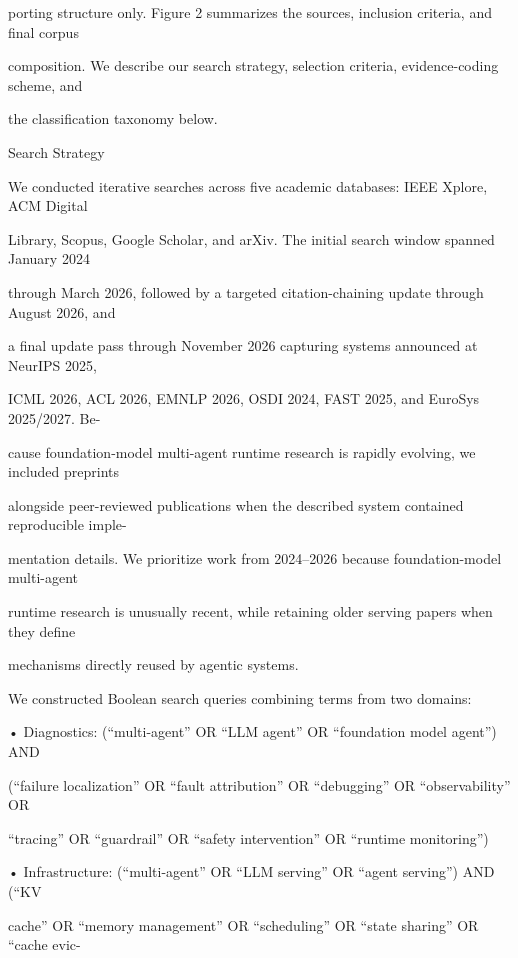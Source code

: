 \begin{flushleft}
\noindent porting structure only. Figure 2 summarizes the sources, inclusion criteria, and final corpus\par
\noindent composition. We describe our search strategy, selection criteria, evidence-coding scheme, and\par
\noindent the classification taxonomy below.\par
\par\smallskip
{} Search Strategy\par
\noindent We conducted iterative searches across five academic databases: IEEE Xplore, ACM Digital\par
\noindent Library, Scopus, Google Scholar, and arXiv. The initial search window spanned January 2024\par
\noindent through March 2026, followed by a targeted citation-chaining update through August 2026, and\par
\noindent a final update pass through November 2026 capturing systems announced at NeurIPS 2025,\par
\noindent ICML 2026, ACL 2026, EMNLP 2026, OSDI 2024, FAST 2025, and EuroSys 2025/2027. Be-\par
\noindent cause foundation-model multi-agent runtime research is rapidly evolving, we included preprints\par
\noindent alongside peer-reviewed publications when the described system contained reproducible imple-\par
\noindent mentation details. We prioritize work from 2024–2026 because foundation-model multi-agent\par
\noindent runtime research is unusually recent, while retaining older serving papers when they define\par
\noindent mechanisms directly reused by agentic systems.\par
\noindent  We constructed Boolean search queries combining terms from two domains:\par
\noindent  • Diagnostics: (“multi-agent” OR “LLM agent” OR “foundation model agent”) AND\par
\noindent  (“failure localization” OR “fault attribution” OR “debugging” OR “observability” OR\par
\noindent  “tracing” OR “guardrail” OR “safety intervention” OR “runtime monitoring”)\par
\noindent  • Infrastructure: (“multi-agent” OR “LLM serving” OR “agent serving”) AND (“KV\par
\noindent  cache” OR “memory management” OR “scheduling” OR “state sharing” OR “cache evic-\par

\end{flushleft}
